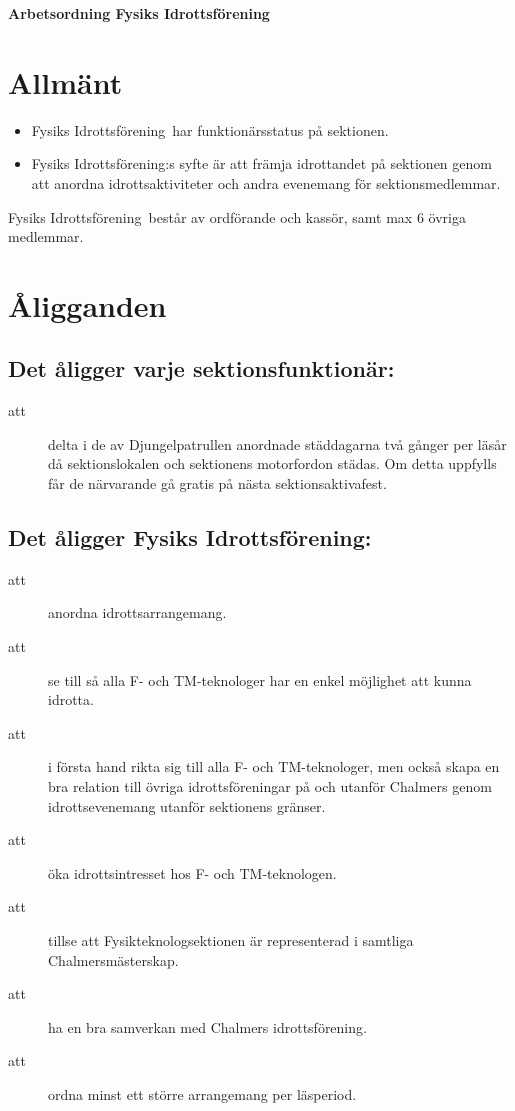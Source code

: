 \renewcommand{\dateseparator}{-} %

\renewcommand{\forening}{Fysiks Idrottsförening}


\begin{center}
\LARGE{\textbf{Arbetsordning \forening}}
\end{center}


\section{Allmänt}
\begin{itemize}
\item \forening \ har funktionärsstatus på sektionen.
\item \forening:s syfte är att främja idrottandet på sektionen genom att anordna idrottsaktiviteter och andra evenemang för sektionsmedlemmar.

\end{itemize}

\forening \ består av ordförande och kassör, samt max 6 övriga medlemmar.

\section{Åligganden}
\subsection{Det åligger varje sektionsfunktionär:}
    \begin{description}
      \item[att] delta i de av Djungelpatrullen anordnade städdagarna två gånger per
      läsår då sektionslokalen och sektionens motorfordon städas. Om detta uppfylls får de närvarande gå gratis på nästa
      sektionsaktivafest.
    \end{description}

\subsection{Det åligger \forening:}
    \begin{description}
      \item[att] anordna idrottsarrangemang.
      \item[att] se till så alla F- och TM-teknologer har en enkel möjlighet att kunna idrotta.
      \item[att] i första hand rikta sig till alla F- och TM-teknologer, men
      också skapa en bra relation till övriga idrottsföreningar på och
      utanför Chalmers genom idrottsevenemang utanför sektionens
      gränser.
      \item[att] öka idrottsintresset hos F- och TM-teknologen.
      \item[att] tillse att Fysikteknologsektionen är representerad i samtliga Chalmers\-mäst\-er\-skap.
      \item[att] ha en bra samverkan med Chalmers idrottsförening.
      \item[att] ordna minst ett större arrangemang per läsperiod.
    \end{description}

